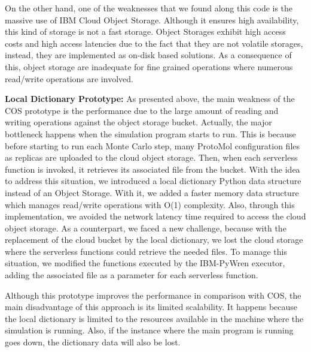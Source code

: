 \documentclass[sigplan, screen]{acmart}
\begin{document}
On the other hand, one of the weaknesses that we found along this code is the massive use of  IBM Cloud Object Storage. Although it ensures high availability,  this kind of storage is not a fast storage. Object Storages exhibit high access costs and high access latencies due to the fact that they are not volatile storages, instead, they are implemented as on-disk based solutions. As a consequence of this, object storage are inadequate for fine grained operations where numerous read/write operations are involved\cite{riseLabServerless}.

\vspace{2mm}
\noindent
\textbf{Local Dictionary Prototype:}
As presented above, the main weakness of the COS prototype is the performance due to the large amount of reading and writing operations against the object storage bucket. Actually, the major bottleneck happens when the simulation program starts to run. This is because before starting to run each Monte Carlo step, many ProtoMol configuration files as replicas are uploaded to the cloud object storage. Then, when each serverless function is invoked, it retrieves its associated file from the bucket. With the idea to address this situation, we introduced a local dictionary Python data structure  instead of  an Object Storage. With it, we added a faster memory data structure which manages read/write operations with O(1) complexity. Also, through this implementation, we avoided the network latency time required to access the cloud object storage. As a counterpart, we faced a new challenge, because with the replacement of the cloud bucket by the local dictionary, we lost the cloud storage where the serverless functions could retrieve the needed files. To manage this situation, we modified the functions executed by the  IBM-PyWren executor, adding the associated file as a parameter for each serverless function.

Although this prototype improves the performance in comparison with COS, the main disadvantage of this approach is its limited scalability. It happens because the local dictionary is limited to the resources available in the machine where the simulation is running. Also, if the instance where the main program is running goes down, the dictionary data will also be lost.
\end{document}
